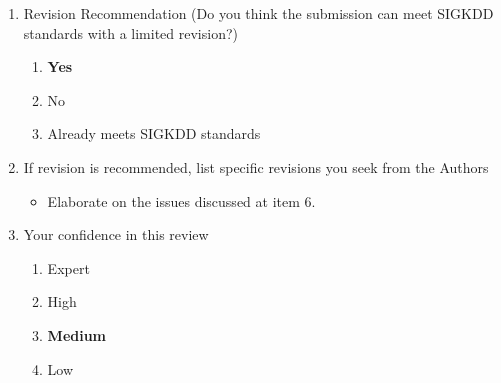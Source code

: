 \documentclass{article}
\begin{document}
\begin{enumerate}
 \item Revision Recommendation (Do you think the submission can meet SIGKDD standards with a limited revision?)
 \begin{enumerate}[I]
  \item \textbf{Yes}
  \item No
  \item Already meets SIGKDD standards
 \end{enumerate}
 
 \item If revision is recommended, list specific revisions you seek from the Authors
 \begin{framed}
  \begin{itemize}
    \item Elaborate on the issues discussed at item 6.
  \end{itemize}
 \end{framed}
 
 \item Your confidence in this review
 \begin{enumerate}[I]
  \item Expert
  \item High
  \item \textbf{Medium}
  \item Low
 \end{enumerate}
 
\end{enumerate}
\end{document}
